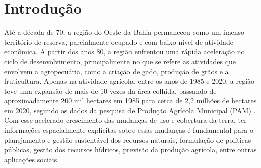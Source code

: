 \chapter{Introdução}

Até a década de 70, a região do Oeste da Bahia permaneceu como um imenso território de reserva, parcialmente ocupado e com baixo nível de atividade econômica. A
partir dos anos 80, a região enfrentou uma rápida aceleração no ciclo de desenvolvimento, principalmente no que se refere as atividades que envolvem a agropecuária, como a criação de gado, produção de grãos e a fruticultura. Apenas na atividade agrícola, entre os anos de 1985 e 2020, a região teve uma expansão de mais de 10 vezes da área colhida, passando de aproximadamente 200 mil hectares em 1985 para cerca de 2,2 milhões de hectares em 2020, segundo os dados da pesquisa de Produção Agrícola Municipal (PAM) \cite{ibge2021pam}. Com esse acelerado crescimento das mudanças de uso e cobertura da terra, ter informações espacialmente explícitas sobre essas mudanças é fundamental para o planejamento e gestão sustentável dos recursos naturais, formulação de políticas públicas, gestão dos recursos hídricos, previsão da produção agrícola, entre outras aplicações sociais.

\renewcommand{\cleardoublepage}{}
\renewcommand{\clearpage}{}
\vspace{5mm}